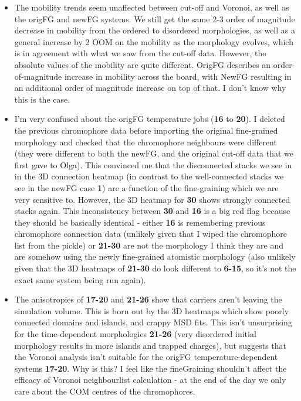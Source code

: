 \documentclass[12pt]{article}
\begin{document}
\begin{itemize}
    \item{The mobility trends seem unaffected between cut-off and Voronoi, as well as the origFG and newFG systems. 
            We still get the same 2-3 order of magnitude decrease in mobility from the ordered to disordered morphologies, as well as a general increase by 2 OOM on the mobility as the morphology evolves, which is in agreement with what we saw from the cut-off data.
            However, the absolute values of the mobility are quite different.
            OrigFG describes an order-of-magnitude increase in mobility across the board, with NewFG resulting in an additional order of magnitude increase on top of that.
        I don't know why this is the case.}
    \item{I'm very confused about the origFG temperature jobs (\textbf{16} to \textbf{20}).
        I deleted the previous chromophore data before importing the original fine-grained morphology and checked that the chromophore neighbours were different (they were different to both the newFG, and the original cut-off data that we first gave to Olga).
    This convinced me that the disconnected stacks we see in in the 3D connection heatmap (in contrast to the well-connected stacks we see in the newFG case \textbf{1}) are a function of the fine-graining which we are very sensitive to.
However, the 3D heatmap for \textbf{30} shows strongly connected stacks again.
This inconsistency between \textbf{30} and \textbf{16} is a big red flag because they should be basically identical - either \textbf{16} is remembering previous chromophore connection data (unlikely given that I wiped the chromophore list from the pickle) or \textbf{21-30} are not the morphology I think they are and are somehow using the newly fine-grained atomistic morphology (also unlikely given that the 3D heatmaps of \textbf{21-30} do look different to \textbf{6-15}, so it's not the exact same system being run again).}
\item{The anisotropies of \textbf{17-20} and \textbf{21-26} show that carriers aren't leaving the simulation volume.
    This is born out by the 3D heatmaps which show poorly connected domains and islands, and crappy MSD fits.
    This isn't unsurprising for the time-dependent morphologies \textbf{21-26} (very disordered initial morphology results in more islands and trapped charges), but suggests that the Voronoi analysis isn't suitable for the origFG temperature-dependent systems \textbf{17-20}.
Why is this? I feel like the fineGraining shouldn't affect the efficacy of Voronoi neighbourlist calculation - at the end of the day we only care about the COM centres of the chromophores.
}
\end{itemize}
\end{document}
